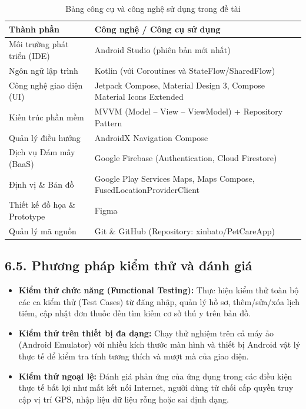 \begin{table}[H]
    \caption{Bảng công cụ và công nghệ sử dụng trong đề tài}
    \label{tab:cong_cu_cong_nghe}
    \centering
    \renewcommand{\arraystretch}{1.2}
    \begin{tabular}{|l|p{9cm}|}
        \hline
        \textbf{Thành phần} & \textbf{Công nghệ / Công cụ sử dụng} \\ \hline
        Môi trường phát triển (IDE) & Android Studio (phiên bản mới nhất) \\ \hline
        Ngôn ngữ lập trình & Kotlin (với Coroutines và StateFlow/SharedFlow) \\ \hline
        Công nghệ giao diện (UI) & Jetpack Compose, Material Design 3, Compose Material Icons Extended \\ \hline
        Kiến trúc phần mềm & MVVM (Model -- View -- ViewModel) + Repository Pattern \\ \hline
        Quản lý điều hướng & AndroidX Navigation Compose \\ \hline
        Dịch vụ Đám mây (BaaS) & Google Firebase (Authentication, Cloud Firestore) \\ \hline
        Định vị \& Bản đồ & Google Play Services Maps, Maps Compose, FusedLocationProviderClient \\ \hline
        Thiết kế đồ họa \& Prototype & Figma \\ \hline
        Quản lý mã nguồn & Git \& GitHub (Repository: xinbato/PetCareApp) \\ \hline
    \end{tabular}
\end{table}

\subsection*{6.5. Phương pháp kiểm thử và đánh giá}
\begin{itemize}
    \item \textbf{Kiểm thử chức năng (Functional Testing):} Thực hiện kiểm thử toàn bộ các ca kiểm thử (Test Cases) từ đăng nhập, quản lý hồ sơ, thêm/sửa/xóa lịch tiêm, cập nhật đơn thuốc đến tìm kiếm cơ sở thú y trên bản đồ.
    \item \textbf{Kiểm thử trên thiết bị đa dạng:} Chạy thử nghiệm trên cả máy ảo (Android Emulator) với nhiều kích thước màn hình và thiết bị Android vật lý thực tế để kiểm tra tính tương thích và mượt mà của giao diện.
    \item \textbf{Kiểm thử ngoại lệ:} Đánh giá phản ứng của ứng dụng trong các điều kiện thực tế bất lợi như mất kết nối Internet, người dùng từ chối cấp quyền truy cập vị trí GPS, nhập liệu dữ liệu rỗng hoặc sai định dạng.
\end{itemize}
